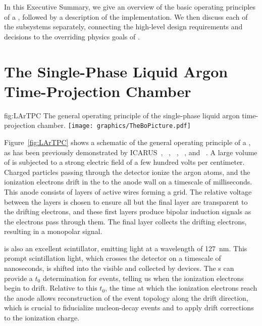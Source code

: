 In this Executive Summary, we give an overview of the basic operating principles of a  , followed by a description of the  implementation. We then discuss each of the subsystems separately, connecting the high-level design requirements and decisions to the overriding physics goals of .

\section{The Single-Phase Liquid Argon Time-Projection Chamber}
\label{sec:fdsp-exec-splar}

\begin{dunefigure}{fig:LArTPC}
{The general operating principle of the single-phase liquid argon time-projection chamber.}
\texttt{[image: graphics/TheBoPicture.pdf]}
\end{dunefigure}

Figure~\ref{fig:LArTPC} shows a schematic of the general operating principle of a  , as has been previously demonstrated by
ICARUS~\cite{Icarus-T600},
~\cite{Anderson:2012vc}, ~\cite{microboone}, ~\cite{Cavanna:2014iqa}, and ~\cite{Abi:2017aow}. A large volume of  is subjected to a strong electric field of a few hundred volts per centimeter. Charged particles passing through the detector ionize the argon atoms, and the ionization electrons drift in the \efield to the anode wall on a timescale of milliseconds. This anode consists of layers of active wires forming a grid. The relative voltage between the layers is chosen to ensure all but the final layer are transparent to the drifting electrons, and these first layers produce bipolar induction signals as the electrons pass through them. The final layer collects the drifting electrons, resulting in a monopolar signal.

 is also an excellent scintillator, emitting  light at a wavelength of \SI{127}{\nano\meter}. This prompt scintillation light, which crosses the detector on a timescale of nanoseconds, is shifted into the visible and collected by  devices. The s can provide a $t_{0}$ determination for events, telling us when the ionization electrons begin to drift. Relative to this $t_{0}$, the time at which the ionization electrons reach the anode allows reconstruction of the event topology along the drift direction, which is crucial to fiducialize nucleon-decay events and to apply drift corrections to the ionization charge.

